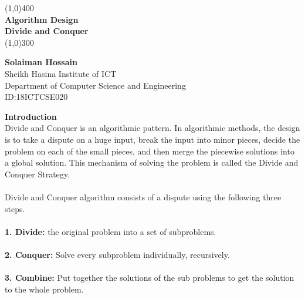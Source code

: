 \documentclass{article}
\begin{document}
\begin{titlepage}


\begin{center}

\line(1,0){400}\\
\huge{\bfseries Algorithm Design \\Divide and Conquer}\\
\line(1,0){300}\\

\end{center}
\vfill
\begin{flushright}
\textbf{\huge Solaiman Hossain}\\
\huge Sheikh Hasina Institute of ICT\\
Department of Computer Science and Engineering\\
ID:18ICTCSE020\\

\end{flushright}
\end{titlepage}

\textbf{\huge{Introduction}}\\

\huge{Divide and Conquer is an algorithmic pattern. In algorithmic methods, the design is to take a dispute on a huge input, break the input into minor pieces, decide the problem on each of the small pieces, and then merge the piecewise solutions into a global solution. This mechanism of solving the problem is called the Divide and Conquer Strategy.}\\
\\
Divide and Conquer algorithm consists of a dispute using the following three steps.

\paragraph{}
\textbf{\huge{ 1. Divide:}}
\huge{the original problem into a set of subproblems.}
\paragraph{}
\textbf{\huge{ 2. Conquer:}}
Solve every subproblem individually, recursively.
\paragraph{}
\textbf{\huge{ 3. Combine:}}
 Put together the solutions of the sub problems to get the solution to the whole problem.\\
 
\end{document}
